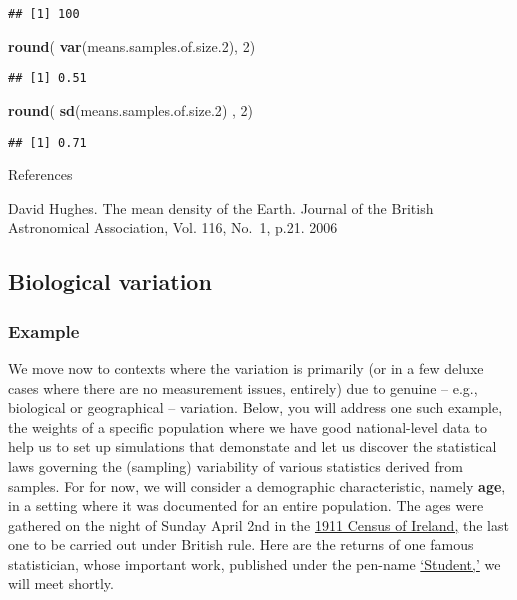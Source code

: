 \documentclass[]{book}
\newenvironment{Shaded}{\begin{snugshade}}{\end{snugshade}}
\newcommand{\DecValTok}[1]{\textcolor[rgb]{0.00,0.00,0.81}{#1}}
\newcommand{\FloatTok}[1]{\textcolor[rgb]{0.00,0.00,0.81}{#1}}
\newcommand{\KeywordTok}[1]{\textcolor[rgb]{0.13,0.29,0.53}{\textbf{#1}}}
\newcommand{\NormalTok}[1]{#1}
\begin{document}
\begin{verbatim}
## [1] 100
\end{verbatim}

\begin{Shaded}
\begin{Highlighting}[]
\KeywordTok{round}\NormalTok{( }\KeywordTok{var}\NormalTok{(means.samples.of.size}\FloatTok{.2}\NormalTok{), }\DecValTok{2}\NormalTok{)}
\end{Highlighting}
\end{Shaded}

\begin{verbatim}
## [1] 0.51
\end{verbatim}

\begin{Shaded}
\begin{Highlighting}[]
\KeywordTok{round}\NormalTok{( }\KeywordTok{sd}\NormalTok{(means.samples.of.size}\FloatTok{.2}\NormalTok{) , }\DecValTok{2}\NormalTok{)}
\end{Highlighting}
\end{Shaded}

\begin{verbatim}
## [1] 0.71
\end{verbatim}

References

David Hughes. The mean density of the Earth.
Journal of the British Astronomical Association, Vol. 116, No.~1, p.21. 2006

\hypertarget{biological-variation}{%
\subsection{Biological variation}\label{biological-variation}}

\hypertarget{example}{%
\subsubsection{Example}\label{example}}

We move now to contexts where the variation is primarily (or in a few deluxe cases where there are no measurement issues, entirely) due to genuine -- e.g., biological or geographical -- variation.
Below, you will address one such example, the weights of a specific population where we have good national-level data to help us to set up simulations that demonstate and let us discover the statistical laws governing the (sampling) variability of various statistics derived from samples. For for now, we will consider a demographic characteristic, namely \textbf{age}, in a setting where it was documented for an entire population. The ages were gathered on the night of Sunday April 2nd in the \href{http://www.census.nationalarchives.ie/help/about19011911census.html}{1911 Census of Ireland,} the last one to be carried out under British rule.
Here are the returns of one famous statistician, whose important work, published under the pen-name \href{http://www.census.nationalarchives.ie/reels/nai000230598/}{`Student,'} we will meet shortly.
\end{document}
